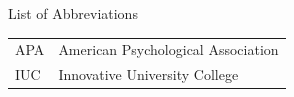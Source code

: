 \begin{frontpage}{List of Abbreviations}
\begin{tabular}{@{}p{3cm}l@{}}
APA & American Psychological Association\\
IUC & Innovative University College\\
\end{tabular}
\end{frontpage}
